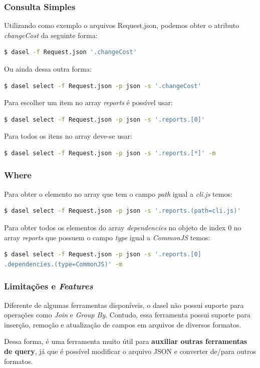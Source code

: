 \documentclass[a4paper, 12pt] {article}
\begin{document}
			\subsubsection{Consulta Simples}
				Utilizando como exemplo o arquivos Request.json, podemos obter o atributo \textit{changeCost} da seguinte forma:
\begin{lstlisting}[language=bash]
$ dasel -f Request.json '.changeCost'
\end{lstlisting}
				Ou ainda dessa outra forma:
\begin{lstlisting}[language=bash]
$ dasel select -f Request.json -p json -s '.changeCost'
\end{lstlisting}
				Para escolher um item no array \textit{reports} é possível usar:
\begin{lstlisting}[language=bash]
$ dasel select -f Request.json -p json -s '.reports.[0]'
\end{lstlisting}
				Para todos os itens no array deve-se usar:
\begin{lstlisting}[language=bash]
$ dasel select -f Request.json -p json -s '.reports.[*]' -m
\end{lstlisting}
			\subsubsection{Where}
				Para obter o elemento no array que tem o campo \textit{path} igual a \textit{cli.js} temos:
\begin{lstlisting}[language=bash]
$ dasel select -f Request.json -p json -s '.reports.(path=cli.js)'
\end{lstlisting}
				Para obter todos os elementos do array \textit{dependencies} no objeto de index 0 no array \textit{reports} que possuem o campo \textit{type} igual a \textit{CommonJS} temos:
\begin{lstlisting}[language=bash]
$ dasel select -f Request.json -p json -s '.reports.[0]
.dependencies.(type=CommonJS)' -m
\end{lstlisting}
			\subsubsection{Limitações e \textit{Features}}
				Diferente de algumas ferramentas disponíveis, o dasel não possui suporte para operações como \textit{Join} e \textit{Group By}. Contudo, essa ferramenta possui suporte para inserção, remoção e atualização de campos em arquivos de diversos formatos.

				Dessa forma, é uma ferramenta muito útil para \textbf{auxiliar outras ferramentas de query}, já que é possível modificar o arquivo JSON e converter de/para outros formatos.
\end{document}
